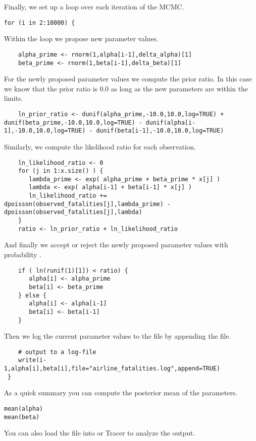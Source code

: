 Finally, we set up a  loop over each iteration of the MCMC.
{\tt \begin{snugshade*}
\begin{lstlisting}    
for (i in 2:10000) {
\end{lstlisting}
\end{snugshade*}}
Within the  loop we propose new parameter values.
{\tt \begin{snugshade*}
\begin{lstlisting}    
    alpha_prime <- rnorm(1,alpha[i-1],delta_alpha)[1]
    beta_prime <- rnorm(1,beta[i-1],delta_beta)[1]
\end{lstlisting}
\end{snugshade*}}
For the newly proposed parameter values we compute the prior ratio.
In this case we know that the prior ratio is 0.0 as long as the new parameters are within the limits.
{\tt \begin{snugshade*}
\begin{lstlisting}    
    ln_prior_ratio <- dunif(alpha_prime,-10.0,10.0,log=TRUE) + dunif(beta_prime,-10.0,10.0,log=TRUE) - dunif(alpha[i-1],-10.0,10.0,log=TRUE) - dunif(beta[i-1],-10.0,10.0,log=TRUE)
\end{lstlisting}
\end{snugshade*}}
Similarly, we compute the likelihood ratio for each observation.
{\tt \begin{snugshade*}
\begin{lstlisting}    
    ln_likelihood_ratio <- 0
    for (j in 1:x.size() ) {
       lambda_prime <- exp( alpha_prime + beta_prime * x[j] )
       lambda <- exp( alpha[i-1] + beta[i-1] * x[j] )
       ln_likelihood_ratio += dpoisson(observed_fatalities[j],lambda_prime) - dpoisson(observed_fatalities[j],lambda)
    }
    ratio <- ln_prior_ratio + ln_likelihood_ratio
\end{lstlisting}
\end{snugshade*}}
And finally we accept or reject the newly proposed parameter values with probability .
{\tt \begin{snugshade*}
\begin{lstlisting}    
    if ( ln(runif(1)[1]) < ratio) {
       alpha[i] <- alpha_prime
       beta[i] <- beta_prime
    } else {
       alpha[i] <- alpha[i-1]
       beta[i] <- beta[i-1]
    }
\end{lstlisting}
\end{snugshade*}}
Then we log the current parameter values to the file by appending the file.
{\tt \begin{snugshade*}
\begin{lstlisting}    
    # output to a log-file
    write(i-1,alpha[i],beta[i],file="airline_fatalities.log",append=TRUE)
 }
\end{lstlisting}
\end{snugshade*}}
As a quick summary you can compute the posterior mean of the parameters.
{\tt \begin{snugshade*}
\begin{lstlisting}    
mean(alpha)
mean(beta)
\end{lstlisting}
\end{snugshade*}}
You can also load the file into \R or Tracer to analyze the output.


